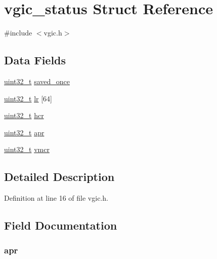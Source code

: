 \hypertarget{structvgic__status}{\section{vgic\-\_\-status \-Struct \-Reference}
\label{structvgic__status}
}


{\ttfamily \#include $<$vgic.\-h$>$}

\subsection*{\-Data \-Fields}
\begin{DoxyCompactItemize}
\item 
\hyperlink{arch__types_8h_a435d1572bf3f880d55459d9805097f62}{uint32\-\_\-t} \hyperlink{structvgic__status_a4dbccb447fcccf8637b1bdc671fe060b}{saved\-\_\-once}
\item 
\hyperlink{arch__types_8h_a435d1572bf3f880d55459d9805097f62}{uint32\-\_\-t} \hyperlink{structvgic__status_a9727a41ead07f3e47db71be25eac72a8}{lr} \mbox{[}64\mbox{]}
\item 
\hyperlink{arch__types_8h_a435d1572bf3f880d55459d9805097f62}{uint32\-\_\-t} \hyperlink{structvgic__status_a1ee8df08f9e72db5f937da9b44749d82}{hcr}
\item 
\hyperlink{arch__types_8h_a435d1572bf3f880d55459d9805097f62}{uint32\-\_\-t} \hyperlink{structvgic__status_a29fe644fefd970ce3c8cfdda21675c86}{apr}
\item 
\hyperlink{arch__types_8h_a435d1572bf3f880d55459d9805097f62}{uint32\-\_\-t} \hyperlink{structvgic__status_aa53861e93b1392d32bab7bac03ff47fc}{vmcr}
\end{DoxyCompactItemize}


\subsection{\-Detailed \-Description}


\-Definition at line 16 of file vgic.\-h.



\subsection{\-Field \-Documentation}
\hypertarget{structvgic__status_a29fe644fefd970ce3c8cfdda21675c86}{
\subsubsection[{apr}]{ {\bf apr}}}\label{structvgic__status_a29fe644fefd970ce3c8cfdda21675c86}


